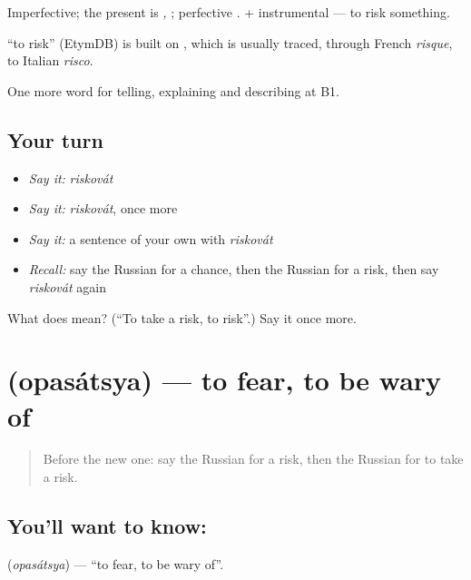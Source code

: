 Imperfective; the present is \emph{, }; perfective \emph{}. \emph{} + instrumental — to risk something.

\begin{cousinweb}
\textbf{} \textquotedblleft{}to risk\textquotedblright{} (EtymDB) is built on \emph{}, which is usually traced, through French \emph{risque}, to Italian \emph{risco}.
\end{cousinweb}

\begin{grammarlens}[title={What you've built}]
One more word for telling, explaining and describing at B1.
\end{grammarlens}

\subsection*{Your turn}
\begin{itemize}
\raggedright
  \item \emph{Say it:} \emph{riskovát}
  \item \emph{Say it:} \emph{riskovát}, once more
  \item \emph{Say it:} a sentence of your own with \emph{riskovát}
  \item \emph{Recall:} say the Russian for a chance, then the Russian for a risk, then say \emph{riskovát} again
\end{itemize}

\begin{tcolorbox}[breakable,colback=teal!4,colframe=teal!35!black,title={Before you move on}]
What does  mean? (\textquotedblleft{}To take a risk, to risk\textquotedblright{}.) Say it once more.
\end{tcolorbox}
\section[\texorpdfstring{\ru{опасаться} (opasátsya)}{опасаться (opasátsya)}]{ (opasátsya) — to fear, to be wary of}

\label{lesson:RU-C373-opasatsya}



\begin{quote}
Before the new one: say the Russian for a risk, then the Russian for to take a risk.
\end{quote}

\subsection*{You'll want to know: }
\textbf{} (\emph{opasátsya}) — \textquotedblleft{}to fear, to be wary of\textquotedblright{}.

